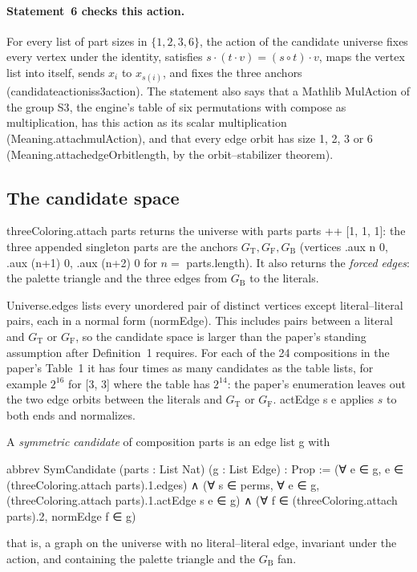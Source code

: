 \documentclass[11pt,a4paper]{article}
\newcommand{\leanus}{\textunderscore\allowbreak}
\newcommand{\lean}[1]{{\ttfamily\let\_\leanus #1}}
\newcommand{\GT}{G_{\mathrm{T}}}
\newcommand{\GF}{G_{\mathrm{F}}}
\newcommand{\GB}{G_{\mathrm{B}}}
\theoremstyle{definition}
\begin{document}
\paragraph{Statement~6 checks this action.}
For every list of part sizes in $\{1,2,3,6\}$, the action of the candidate
universe fixes every vertex under the identity, satisfies
$s\cdot(t\cdot v)=(s\circ t)\cdot v$, maps the vertex list into itself, sends
$x_i$ to $x_{s(i)}$, and fixes the three anchors
(\lean{candidate\_action\_is\_s3\_action}). The statement also says that a
Mathlib \lean{MulAction} of the group \lean{S3}, the engine's table of six
permutations with \lean{compose} as multiplication, has this action as its
scalar multiplication (\lean{Meaning.attach\_mulAction}), and that every edge
orbit has size 1, 2, 3 or 6 (\lean{Meaning.attach\_edgeOrbit\_length}, by the
orbit--stabilizer theorem).

\subsection{The candidate space}
\lean{threeColoring.attach parts} returns the universe with parts
\lean{parts ++ [1, 1, 1]}: the three appended singleton parts are the anchors
$\GT,\GF,\GB$ (vertices \lean{.aux n 0}, \lean{.aux (n+1) 0},
\lean{.aux (n+2) 0} for $n=$ \lean{parts.length}). It also returns the
\emph{forced edges}: the palette triangle and the three edges from $\GB$ to
the literals.

\lean{Universe.edges} lists every unordered pair of distinct vertices except
literal--literal pairs, each in a normal form (\lean{normEdge}). This
includes pairs between a literal and $\GT$ or $\GF$, so the candidate space
is larger than the paper's standing assumption after Definition~1 requires.
For each of the 24 compositions in the paper's Table~1 it has four times as
many candidates as the table lists, for example $2^{16}$ for \lean{[3, 3]}
where the table has $2^{14}$: the paper's enumeration leaves out the two
edge orbits between the literals and $\GT$ or $\GF$.
\lean{actEdge s e} applies $s$ to both ends and normalizes.

A \emph{symmetric candidate} of composition \lean{parts} is an edge list
\lean{g} with
\begin{code}
abbrev SymCandidate (parts : List Nat) (g : List Edge) : Prop :=
  (∀ e ∈ g, e ∈ (threeColoring.attach parts).1.edges) ∧
  (∀ s ∈ perms, ∀ e ∈ g, (threeColoring.attach parts).1.actEdge s e ∈ g) ∧
  (∀ f ∈ (threeColoring.attach parts).2, normEdge f ∈ g)
\end{code}
that is, a graph on the universe with no literal--literal edge, invariant
under the action, and containing the palette triangle and the $\GB$ fan.
\end{document}
